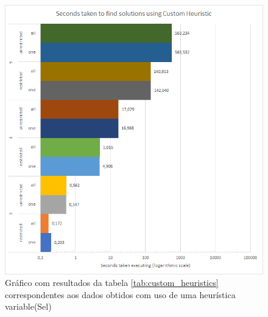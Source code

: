 \begin{figure}[ht]
\centering
\includegraphics[width=\textwidth]{figuras/graphs/custom_heuristic.png}
\caption{Gráfico com resultados da tabela \ref{tab:custom_heuristics} correspondentes aos dados obtidos com uso de uma heurística variable(Sel)}
\label{gph:custom_heuristics}
\end{figure}